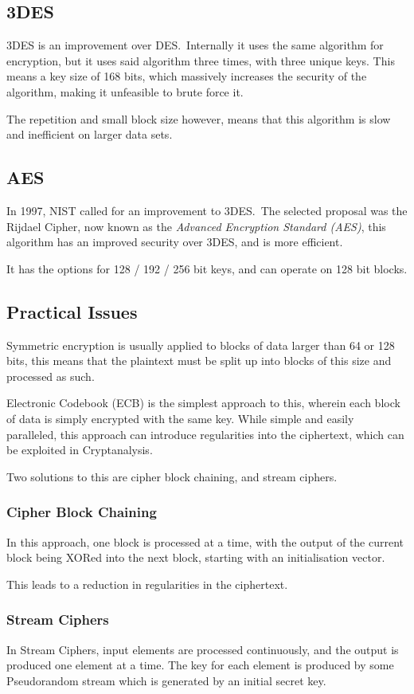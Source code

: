 \subsection{3DES}
3DES is an improvement over DES.\ Internally it uses the same algorithm for encryption, but it uses said
algorithm three times, with three unique keys. This means a key size of 168 bits, which massively increases
the security of the algorithm, making it unfeasible to brute force it.

The repetition and small block size however, means that this algorithm is slow and inefficient on larger data sets.

\subsection{AES}
In 1997, NIST called for an improvement to 3DES.\ The selected proposal was the Rijdael Cipher, now known as the 
\textit{Advanced Encryption Standard (AES)}, this algorithm has an improved security over 3DES, and is more efficient.

It has the options for 128 / 192 / 256 bit keys, and can operate on 128 bit blocks.

\subsection{Practical Issues}
Symmetric encryption is usually applied to blocks of data larger than 64 or 128 bits, this means that the plaintext
must be split up into blocks of this size and processed as such.

Electronic Codebook (ECB) is the simplest approach to this, wherein each block of data is simply encrypted with the same
key. While simple and easily paralleled, this approach can introduce regularities into the ciphertext, which can be
exploited in Cryptanalysis.

Two solutions to this are cipher block chaining, and stream ciphers.

\subsubsection{Cipher Block Chaining}
In this approach, one block is processed at a time, with the output of the current block being XORed into the next block,
starting with an initialisation vector.

This leads to a reduction in regularities in the ciphertext.

\subsubsection{Stream Ciphers}
In Stream Ciphers, input elements are processed continuously, and the output is produced one element at a time. The
key for each element is produced by some Pseudorandom stream which is generated by an initial secret key.

